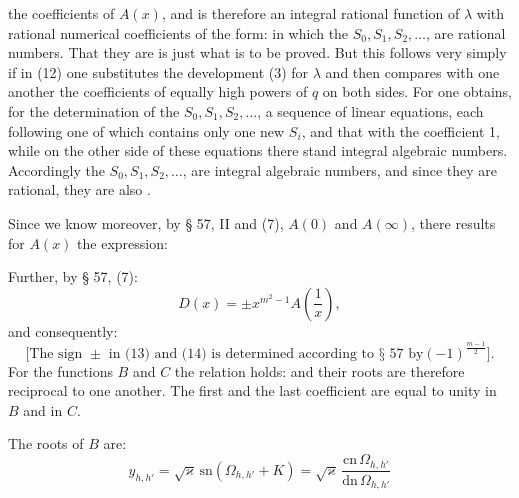 the coefficients of $A(x)$, and is therefore an
integral rational function of $\lambda$ with rational numerical coefficients
of the form:
in which the $S_0, S_1, S_2, \ldots$, are rational numbers. That they are
 is just what is to be proved. But this follows very simply if in
(12) one substitutes the development (3) for $\lambda$ and then compares
with one another the coefficients of equally high powers of $q$ on both
sides. For one obtains, for the determination of the $S_0, S_1, S_2, \ldots$,
a sequence of linear equations, each following one of which contains only
one new $S_i$, and that with the coefficient 1, while on the other side of
these equations there stand integral algebraic numbers. Accordingly the
$S_0, S_1, S_2, \ldots$, are integral algebraic numbers, and since they are
rational, they are also .

Since we know moreover, by § 57, II and (7), $A(0)$ and $A(\infty)$,
there results for $A(x)$ the expression:

Further, by § 57, (7):
\[
D(x) = \pm x^{m^2-1} A\left(\frac{1}{x}\right),
\]
and consequently:
\[
\text{[The sign } \pm \text{ in (13) and (14) is determined according to § 57 by}
(-1)^{\frac{m-1}{2}}\text{].}
\]
For the functions $B$ and $C$ the relation holds:
and their roots are therefore reciprocal to one another. The first and
the last coefficient are equal to unity in $B$ and in $C$.

The roots of $B$ are:
\[
y_{h,h'} = \sqrt{\varkappa}\,\mathrm{sn}(\Omega_{h,h'}+K) = \sqrt{\varkappa}\,\frac{\mathrm{cn}\,\Omega_{h,h'}}{\mathrm{dn}\,\Omega_{h,h'}}
\]
